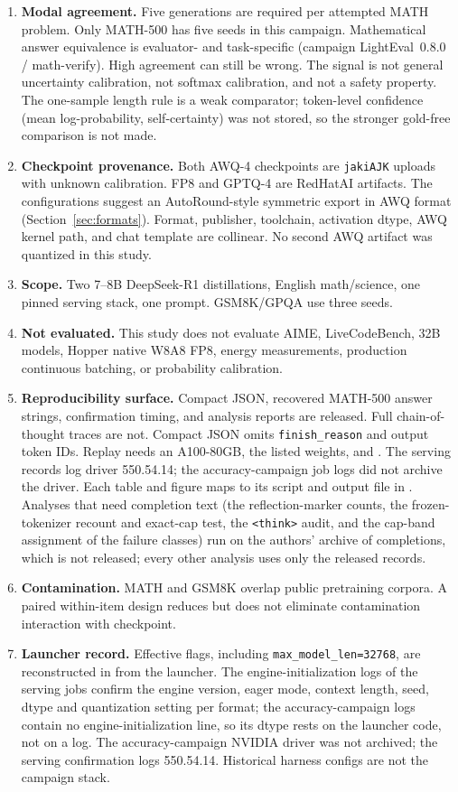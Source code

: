 \documentclass[11pt,a4paper]{article}
\begin{document}
\begin{enumerate}
    \item \textbf{Modal agreement.} Five generations are required per attempted MATH problem. Only MATH-500 has five seeds in this campaign. Mathematical answer equivalence is evaluator- and task-specific (campaign LightEval~0.8.0 / math-verify). High agreement can still be wrong. The signal is not general uncertainty calibration, not softmax calibration, and not a safety property. The one-sample length rule is a weak comparator; token-level confidence (mean log-probability, self-certainty) was not stored, so the stronger gold-free comparison is not made.
    \item \textbf{Checkpoint provenance.} Both AWQ-4 checkpoints are \texttt{jakiAJK} uploads with unknown calibration. FP8 and GPTQ-4 are RedHatAI artifacts. The configurations suggest an AutoRound-style symmetric export in AWQ format (Section~\ref{sec:formats}). Format, publisher, toolchain, activation dtype, AWQ kernel path, and chat template are collinear. No second AWQ artifact was quantized in this study.
    \item \textbf{Scope.} Two 7--8B DeepSeek-R1 distillations, English math/science, one pinned serving stack, one prompt. GSM8K/GPQA use three seeds.
    \item \textbf{Not evaluated.} This study does not evaluate AIME, LiveCodeBench, 32B models, Hopper native W8A8 FP8, energy measurements, production continuous batching, or probability calibration.
    \item \textbf{Reproducibility surface.} Compact JSON, recovered MATH-500 answer strings, confirmation timing, and analysis reports are released. Full chain-of-thought traces are not. Compact JSON omits \texttt{finish\_reason} and output token IDs. Replay needs an A100-80GB, the listed weights, and . The serving records log driver 550.54.14; the accuracy-campaign job logs did not archive the driver. Each table and figure maps to its script and output file in . Analyses that need completion text (the reflection-marker counts, the frozen-tokenizer recount and exact-cap test, the \texttt{<think>} audit, and the cap-band assignment of the failure classes) run on the authors' archive of completions, which is not released; every other analysis uses only the released records.
    \item \textbf{Contamination.} MATH and GSM8K overlap public pretraining corpora. A paired within-item design reduces but does not eliminate contamination interaction with checkpoint.
    \item \textbf{Launcher record.} Effective flags, including \texttt{max\_model\_len=32768}, are reconstructed in  from the launcher. The engine-initialization logs of the serving jobs confirm the engine version, eager mode, context length, seed, dtype and quantization setting per format; the accuracy-campaign logs contain no engine-initialization line, so its dtype rests on the launcher code, not on a log. The accuracy-campaign NVIDIA driver was not archived; the serving confirmation logs 550.54.14. Historical harness configs are not the campaign stack.
\end{enumerate}
\end{document}
